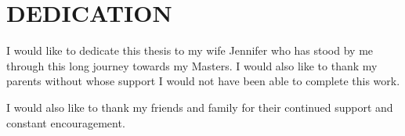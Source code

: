 \chapter*{DEDICATION}

I would like to dedicate this thesis to my wife Jennifer who has stood by me through this long journey towards my Masters.  I would also like to thank my parents without whose support I would not have been able to complete this work.

I would also like to thank my friends and family for their continued support and constant encouragement.